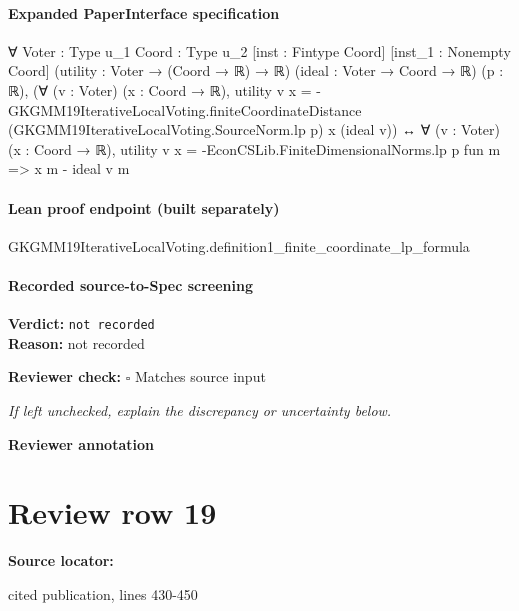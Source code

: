 \documentclass[10pt]{article}
\newcommand{\reviewerbox}{%
  \par\noindent\fbox{\parbox{0.96\linewidth}{\rule{0pt}{0.38in}}}\par
}
\newcommand{\reviewmatch}[1]{%
  \par\noindent\textbf{Reviewer check:} $\square$\; #1\par
  \noindent\emph{If left unchecked, explain the discrepancy or uncertainty below.}\par
}
\begin{document}
\paragraph{Expanded PaperInterface specification}
\begin{ReviewVerbatim}
∀ {Voter : Type u_1} {Coord : Type u_2} [inst : Fintype Coord] [inst_1 : Nonempty Coord]
  (utility : Voter → (Coord → ℝ) → ℝ) (ideal : Voter → Coord → ℝ) (p : ℝ),
  (∀ (v : Voter) (x : Coord → ℝ),
      utility v x =
        -GKGMM19IterativeLocalVoting.finiteCoordinateDistance (GKGMM19IterativeLocalVoting.SourceNorm.lp p) x
            (ideal v)) ↔
    ∀ (v : Voter) (x : Coord → ℝ), utility v x = -EconCSLib.FiniteDimensionalNorms.lp p fun m => x m - ideal v m
\end{ReviewVerbatim}

\paragraph{Lean proof endpoint (built separately)}\begin{ReviewVerbatim}
GKGMM19IterativeLocalVoting.definition1_finite_coordinate_lp_formula
\end{ReviewVerbatim}

\paragraph{Recorded source-to-Spec screening}
\textbf{Verdict:} \texttt{not recorded}
\\
\textbf{Reason:} not recorded
\reviewmatch{Matches source input}
\noindent\textbf{Reviewer annotation}\par
\reviewerbox
\clearpage
\hypertarget{source-claim-2cc921d535fb2213}{}
\section*{Review row 19}
\textbf{Source locator:} {\footnotesize\raggedright cited publication, lines 430-\allowbreak{}450\par}
\end{document}
